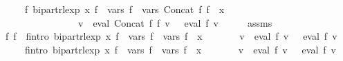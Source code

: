 \begin{isabellebody}
\ \ \ \ \ {\isachardoublequoteopen}{\isasymexists}f{\isacharprime}{\kern0pt}{\isachardot}{\kern0pt}\ bipart{\isacharunderscore}{\kern0pt}rlexp\ x\ f{\isacharprime}{\kern0pt}\ {\isasymand}\ vars\ f{\isacharprime}{\kern0pt}\ {\isacharequal}{\kern0pt}\ vars\ {\isacharparenleft}{\kern0pt}Concat\ f{}\ f{}{\isacharparenright}{\kern0pt}\ {\isasymunion}\ {\isacharbraceleft}{\kern0pt}x{\isacharbraceright}{\kern0pt}\ {\isasymand}\isanewline
\ \ \ \ \ \ \ \ \ \ \ \ \ \ \ \ {\isacharparenleft}{\kern0pt}{\isasymforall}v{\isachardot}{\kern0pt}\ {\isasymPsi}\ {\isacharparenleft}{\kern0pt}eval\ {\isacharparenleft}{\kern0pt}Concat\ f{}\ f{}{\isacharparenright}{\kern0pt}\ v{\isacharparenright}{\kern0pt}\ {\isacharequal}{\kern0pt}\ {\isasymPsi}\ {\isacharparenleft}{\kern0pt}eval\ f{\isacharprime}{\kern0pt}\ v{\isacharparenright}{\kern0pt}{\isacharparenright}{\kern0pt}{\isachardoublequoteclose}\isanewline
%
\isadelimproof
%
\endisadelimproof
%
\isatagproof
{}\isamarkupfalse%
\ {\isacharminus}{\kern0pt}\isanewline
\ \ \isamarkupfalse%
\ assms\ \isamarkupfalse%
\ f{}{\isacharprime}{\kern0pt}\ f{}{\isacharprime}{\kern0pt}\ \ f{}{\isacharprime}{\kern0pt}{\isacharunderscore}{\kern0pt}intro{\isacharcolon}{\kern0pt}\ {\isachardoublequoteopen}bipart{\isacharunderscore}{\kern0pt}rlexp\ x\ f{}{\isacharprime}{\kern0pt}\ {\isasymand}\ vars\ f{}{\isacharprime}{\kern0pt}\ {\isacharequal}{\kern0pt}\ vars\ f{}\ {\isasymunion}\ {\isacharbraceleft}{\kern0pt}x{\isacharbraceright}{\kern0pt}\ {\isasymand}\isanewline
\ \ \ \ \ \ {\isacharparenleft}{\kern0pt}{\isasymforall}v{\isachardot}{\kern0pt}\ {\isasymPsi}\ {\isacharparenleft}{\kern0pt}eval\ f{}\ v{\isacharparenright}{\kern0pt}\ {\isacharequal}{\kern0pt}\ {\isasymPsi}\ {\isacharparenleft}{\kern0pt}eval\ f{}{\isacharprime}{\kern0pt}\ v{\isacharparenright}{\kern0pt}{\isacharparenright}{\kern0pt}{\isachardoublequoteclose}\isanewline
\ \ \ \ \ f{}{\isacharprime}{\kern0pt}{\isacharunderscore}{\kern0pt}intro{\isacharcolon}{\kern0pt}\ {\isachardoublequoteopen}bipart{\isacharunderscore}{\kern0pt}rlexp\ x\ f{}{\isacharprime}{\kern0pt}\ {\isasymand}\ vars\ f{}{\isacharprime}{\kern0pt}\ {\isacharequal}{\kern0pt}\ vars\ f{}\ {\isasymunion}\ {\isacharbraceleft}{\kern0pt}x{\isacharbraceright}{\kern0pt}\ {\isasymand}\isanewline
\ \ \ \ \ \ {\isacharparenleft}{\kern0pt}{\isasymforall}v{\isachardot}{\kern0pt}\ {\isasymPsi}\ {\isacharparenleft}{\kern0pt}eval\ f{}\ v{\isacharparenright}{\kern0pt}\ {\isacharequal}{\kern0pt}\ {\isasymPsi}\ {\isacharparenleft}{\kern0pt}eval\ f{}{\isacharprime}{\kern0pt}\ v{\isacharparenright}{\kern0pt}{\isacharparenright}{\kern0pt}{\isachardoublequoteclose}\isanewline

\end{isabellebody}
